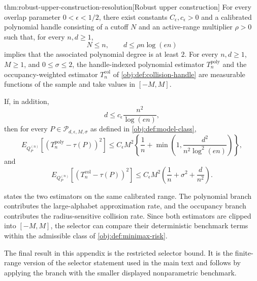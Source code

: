 \begin{theoremv}{thm:robust-upper-construction-resolution}[Robust upper construction]
For every overlap parameter \(0<\epsilon<1/2\), there exist constants \(C_{\epsilon},c_{\epsilon}>0\) and a calibrated polynomial handle consisting of a cutoff \(N\) and an active-range multiplier \(\rho>0\) such that, for every \(n,d\ge 1\),
\[
N\le n,\qquad d\le \rho n\log(en)
\]
implies that the associated polynomial degree is at least \(2\). For every \(n,d\ge 1\), \(M\ge 1\), and \(0\le \sigma\le 2\), the handle-indexed polynomial estimator \(T_n^{\mathrm{poly}}\) and the occupancy-weighted estimator \(T_n^{\mathrm{col}}\) of \cref{obj:def:collision-handle} are measurable functions of the sample and take values in \([-M,M]\).

If, in addition,
\[
d\le c_{\epsilon}\frac{n^2}{\log(en)},
\]
then for every \(P\in\mathcal P_{d,\epsilon,M,\sigma}\) as defined in \cref{obj:def:model-class},
\[
E_{Q_P^{(n)}}\!\left[\left(T_n^{\mathrm{poly}}-\tau(P)\right)^2\right]
\le
C_{\epsilon}M^2
\left\{
\frac1n+\min\left(1,\frac{d^2}{n^2\log^2(en)}\right)
\right\},
\]
and
\[
E_{Q_P^{(n)}}\!\left[\left(T_n^{\mathrm{col}}-\tau(P)\right)^2\right]
\le
C_{\epsilon}M^2
\left(
\frac1n+\sigma^2+\frac{d}{n^2}
\right).
\]
\end{theoremv}

 states the two estimators on the same calibrated range. The polynomial branch contributes the large-alphabet approximation rate, and the occupancy branch contributes the radius-sensitive collision rate. Since both estimators are clipped into \([-M,M]\), the selector can compare their deterministic benchmark terms within the admissible class of \cref{obj:def:minimax-risk}.

The final result in this appendix is the restricted selector bound. It is the finite-range version of the selector statement used in the main text and follows by applying the branch with the smaller displayed nonparametric benchmark.

